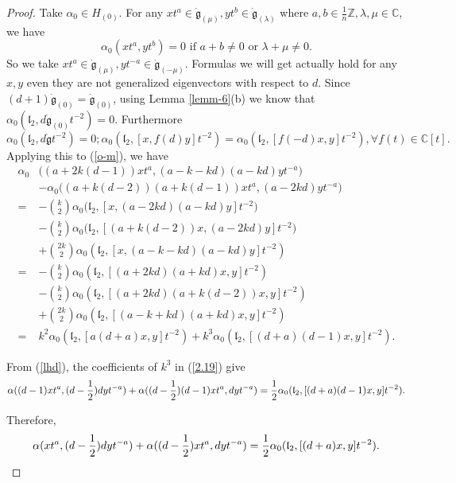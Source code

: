 \documentclass[1p]{elsarticle}
\numberwithin{equation}{section}
\def\dg{\dot{\mathfrak{g}}}
\def\bC{\mathbb{C}}
\def\bZ{\mathbb{Z}}
\def\fl{\mathfrak{l}}
\begin{document}
 \begin{proof} Take $\alpha_{0}\in H_{(0)}$. For any $xt^a\in \dg_{(\mu)},yt^{b}\in \dg_{(\lambda)}
 	$  where $a, b\in\frac 1n\bZ, \lambda,\mu\in\bC$, we have
 	$$\alpha_{0}(xt^a,yt^b)=0\text{ if }a+b\ne0\text{ or }\lambda+\mu\ne 0.$$
 	So we take  $xt^a\in \dg_{(\mu)},yt^{-a}\in \dg_{(-\mu)}$. Formulas we will get   actually hold for any $x, y$ even they are not generalized eigenvectors with respect to $d$. Since
 	$(d+1)\dg_{(0)}=\dg_{(0)}$,
 	using Lemma \ref{lemm-6}(b) we know   that $\alpha_{0}(\fl_2  ,d\dg_{(0)}t^{-2})=0$. Furthermore
 	\begin{equation}\label{d}
 		\alpha_{0}(\fl_2  ,d\dg t^{-2})=0; \alpha_0(\fl_2, [x,f(d)y]t^{-2})=\alpha_0(\fl_2,[f(-d)x,y]t^{-2}),\forall f(t)\in \bC[t].\end{equation}
 	Applying this to  (\ref{o-m}), we have
 \begin{equation}\label{2.19}\begin{aligned}\alpha_{0}&\big((a+2k(d-1))xt^a,(a-k-kd)(a-kd)yt^{-a}\big)\\ &-\alpha_{0}\big((a+k(d-2))(a+k(d-1))xt^a,(a-2kd)yt^{-a}\big)\\=&-\binom k2\alpha_{0}\big(\fl_{2},[x,(a-2kd)(a-kd)y]t^{-2}\big)\\
 		&-\binom k2\alpha_{0}\big(\fl_{2},[(a+k(d-2))x,(a-2kd)y]t^{-2}\big)\\&
+\binom {2k}2\alpha_{0}(\fl_{2},[x,(a-k-kd)(a-kd)y]t^{-2})\\
=&-\binom k2\alpha_{0}(\fl_{2},[(a+2kd)(a+kd)x,y]t^{-2})\\
 		&-\binom k2\alpha_{0}(\fl_{2},[(a+2kd)(a+k(d-2))x,y]t^{-2})\\&
+\binom {2k}2\alpha_{0}(\fl_{2},[(a-k+kd)(a+kd)x,y]t^{-2})\\
=&k^2\alpha_{0}(\fl_{2},[a(d+a)x,y]t^{-2})+k^3\alpha_{0}(\fl_{2},[(d+a)(d-1)x,y]t^{-2}).\end{aligned}\end{equation}




From (\ref{lhd}), the coefficients of $k^3$ in (\ref{2.19}) give
$$\alpha((d-1)xt^a, (d-\frac 12)dyt^{-a})+\alpha((d-\frac 12)(d-1)xt^a,dyt^{-a})\\
=\frac 12 \alpha_{0}(\fl_2,[(d+a)(d-1)x,y]t^{-2}).
$$

Therefore, $$\alpha(xt^a, (d-\frac 12)dyt^{-a})+\alpha((d-\frac 12)xt^a,dyt^{-a})\\
=\frac 12\alpha_{0}(\fl_2,[(d+a)x,y]t^{-2}).
$$



\end{proof}
\end{document}
